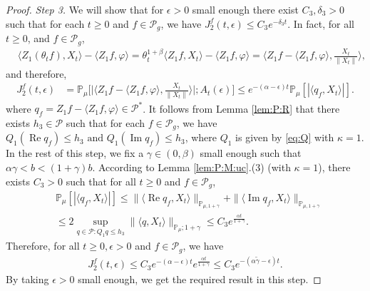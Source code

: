 \documentclass[12pt,a4paper]{amsart}
\theoremstyle{plain}
\theoremstyle{definition}
\numberwithin{equation}{section}
\begin{document}
\begin{proof}
\emph{Step 3.}
We will show that for $\epsilon>0$ small enough there exist $C_3, \delta_3 > 0$ such that for each $t \geq 0$ and $f\in \mathcal P_g$,  we have $ J^f_2(t,\epsilon) \leq C_3 e^{-\delta_3 t}$.
In fact, for all $t\geq 0$, and $f\in \mathcal P_g$,
\begin{align}
  & \langle Z_1(\theta_t f),X_{t}\rangle- \langle Z_1f, \varphi\rangle
     = \theta_t^{1+\beta} \langle Z_1 f,X_t\rangle - \langle  Z_1 f,\varphi \rangle
     =\Big\langle Z_1f - \langle  Z_1 f ,\varphi \rangle, \frac{X_{t}}{\|X_{t}\|}\Big\rangle,
\end{align}
and therefore,
\begin{align}
  \label{eq: prevJ2}
  J^f_2(t,\epsilon)
  & = \mathbb P_\mu\Big[\Big| \Big\langle Z_1f - \langle  Z_1 f ,\varphi \rangle, \frac{X_t}{\|X_t\|}\Big\rangle \Big|;A_t(\epsilon)\Big]
    \leq e^{-(\alpha-\epsilon)t} \mathbb{P}_{\mu}[| \langle q_f,X_t \rangle |].
\end{align}
where $ q_f = Z_1 f-\langle  Z_1 f,\varphi\rangle \in \mathcal P^*$.
It follows from Lemma \ref{lem:P:R} that there exists $h_{3}\in \mathcal{P}$ such that for each $ f\in \mathcal P_g$, we have $Q_1 (\operatorname{Re} q_f) \leq h_{3} \text{ and } Q_1 (\operatorname{Im} q_f)\leq h_3$, where $Q_1$ is given by \eqref{eq:Q} with $\kappa=1$.
In the rest of this step, we  fix a $\gamma\in(0,\beta)$ small enough such that $\alpha \gamma < b < (1+\gamma)b$.
According to Lemma \ref{lem:P:M:uc}.(3) (with $\kappa=1$), there exists $C_{3}>0$ such that for all $t\geq 0$ and $f\in \mathcal P_g$,
\begin{align}
  & \mathbb{P}_{\mu}\left[\left|\langle q_f,X_{t}\rangle\right|\right]
    \leq \|\langle \operatorname{Re} q_f, X_{t}\rangle\|_{\mathbb{P}_{\mu,1+\gamma}} + \|\langle \operatorname{Im} q_f, X_{t}\rangle\|_{\mathbb{P}_{\mu,1+\gamma}} \\
 & \leq 2\sup_{q\in \mathcal P: Q_1 q\leq h_{3}} \|\langle q, X_t\rangle\|_{\mathbb P_\mu; 1+\gamma} \leq C_{3} e^{\frac{\alpha t}{1+\gamma}}.
\end{align}
Therefore, for all $t\geq 0, \epsilon > 0$ and $f \in \mathcal P_g$, we have
\begin{align}
  \label{eq: right bound for J2}
   J^f_2(t, \epsilon)
    \leq  C_3 e^{-(\alpha-\epsilon)t}e^{\frac{\alpha t}{1+\gamma}}
   \leq C_{3} e^{-(\alpha\tilde \gamma -\epsilon)t}.
\end{align}
By taking $\epsilon >0$ small enough, we get the required result in this step.


\end{proof}
\end{document}
